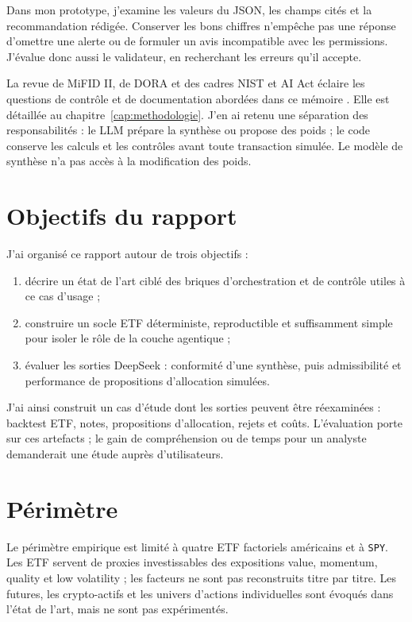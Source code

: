 Dans mon prototype, j'examine les valeurs du JSON, les champs cités et la recommandation rédigée. Conserver les bons chiffres n'empêche pas une réponse d'omettre une alerte ou de formuler un avis incompatible avec les permissions. J'évalue donc aussi le validateur, en recherchant les erreurs qu'il accepte.

La revue de MiFID II, de DORA et des cadres NIST et AI Act éclaire les questions de contrôle et de documentation abordées dans ce mémoire \citep{mifidArticle17,dora2022,nistAirmf2023,euAiAct2024}. Elle est détaillée au chapitre~\ref{cap:methodologie}. J'en ai retenu une séparation des responsabilités : le LLM prépare la synthèse ou propose des poids ; le code conserve les calculs et les contrôles avant toute transaction simulée. Le modèle de synthèse n'a pas accès à la modification des poids.

\section{Objectifs du rapport}

J'ai organisé ce rapport autour de trois objectifs :
\begin{enumerate}
    \item décrire un état de l'art ciblé des briques d'orchestration et de contrôle utiles à ce cas d'usage ;
    \item construire un socle ETF déterministe, reproductible et suffisamment simple pour isoler le rôle de la couche agentique ;
    \item évaluer les sorties DeepSeek : conformité d'une synthèse, puis admissibilité et performance de propositions d'allocation simulées.
\end{enumerate}

J'ai ainsi construit un cas d'étude dont les sorties peuvent être réexaminées : backtest ETF, notes, propositions d'allocation, rejets et coûts. L'évaluation porte sur ces artefacts ; le gain de compréhension ou de temps pour un analyste demanderait une étude auprès d'utilisateurs.

\section{Périmètre}

Le périmètre empirique est limité à quatre ETF factoriels américains et à \texttt{SPY}. Les ETF servent de proxies investissables des expositions value, momentum, quality et low volatility ; les facteurs ne sont pas reconstruits titre par titre. Les futures, les crypto-actifs et les univers d'actions individuelles sont évoqués dans l'état de l'art, mais ne sont pas expérimentés.

